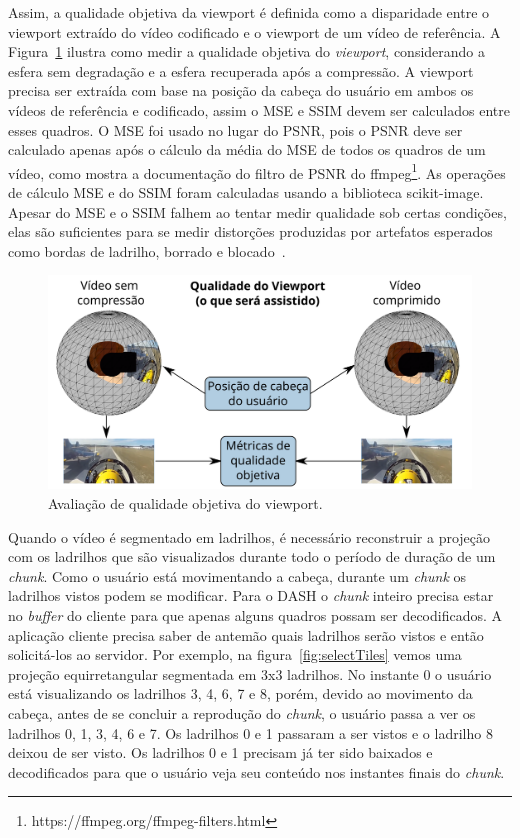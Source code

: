 Assim, a qualidade objetiva da viewport é definida como a disparidade entre o viewport extraído do vídeo codificado e o viewport de um vídeo de referência.   A Figura~\ref{fig:QualityWorkflow} ilustra como medir a qualidade objetiva do \textit{viewport}, considerando a esfera sem degradação e a esfera recuperada após a compressão. A viewport precisa ser extraída com base na posição da cabeça do usuário em ambos os vídeos de referência e codificado, assim o MSE e SSIM devem ser calculados entre esses quadros. O MSE foi usado no lugar do PSNR, pois o PSNR deve ser calculado apenas após o cálculo da média do MSE de todos os quadros de um vídeo, como mostra a documentação do filtro de PSNR do ffmpeg\footnote{https://ffmpeg.org/ffmpeg-filters.html}. As operações de cálculo MSE e do SSIM foram calculadas usando a biblioteca scikit-image. Apesar do MSE e o SSIM falhem ao tentar medir qualidade sob certas condições, elas são suficientes para se medir distorções produzidas por artefatos esperados como bordas de ladrilho, borrado e blocado~\cite{Bovik2009}.

\begin{figure}[h]
        \centering
        \includegraphics[width=0.8\linewidth]{fig/Project_Quality_Workflow_2.png}
        \caption{Avaliação de qualidade objetiva do viewport.}
        \label{fig:QualityWorkflow}
\end{figure}

Quando o vídeo é segmentado em ladrilhos, é necessário reconstruir a projeção com os ladrilhos que são visualizados durante todo o período de duração de um \textit{chunk}. Como o usuário está movimentando a cabeça, durante um \textit{chunk} os ladrilhos vistos podem se modificar. Para o DASH o \textit{chunk} inteiro precisa estar no \textit{buffer} do cliente para que apenas alguns quadros possam ser decodificados. A aplicação cliente precisa saber de antemão quais ladrilhos serão vistos e então solicitá-los ao servidor. Por exemplo, na figura~\ref{fig:selectTiles} vemos uma projeção equirretangular segmentada em 3x3 ladrilhos. No instante 0 o usuário está visualizando os ladrilhos 3, 4, 6, 7 e 8, porém, devido ao movimento da cabeça, antes de se concluir a reprodução do \textit{chunk}, o usuário passa a ver os ladrilhos 0, 1, 3, 4, 6 e 7. Os ladrilhos 0 e 1 passaram a ser vistos e o ladrilho 8 deixou de ser visto. Os ladrilhos 0 e 1 precisam já ter sido baixados e decodificados para que o usuário veja seu conteúdo nos instantes finais do \textit{chunk}.

